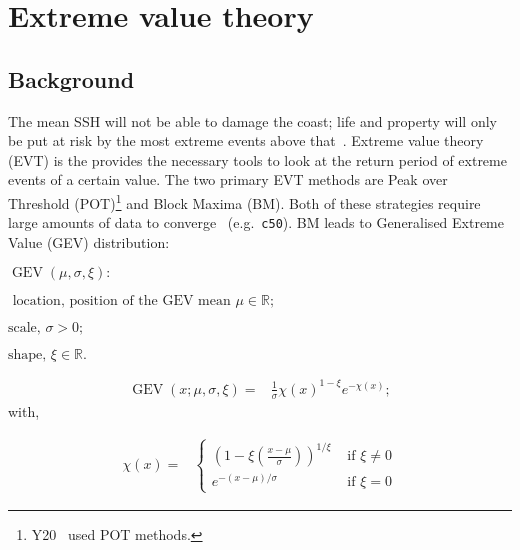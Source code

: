 \newpage
\newpage
[.]
\pagebreak

\section{Extreme value theory}
\label{sec:evt}
\subsection{Background}
The mean SSH will
not be able to damage the coast; life and property will only be put
at risk by the most extreme events above that~\cite{taleb2019statistical, Taleb2012AntifragileH}.
Extreme value theory (EVT) is the provides the necessary tools
to look at the return period of extreme events of a certain value.
The two primary EVT methods are Peak over Threshold (POT)\footnote{Y20~\cite{ZannaPreprint} used POT methods. } and Block Maxima (BM).
Both of these strategies require
large amounts of data to converge~\cite{taleb2019much} (e.g.~\texttt{c50}).
BM leads to Generalised Extreme Value (GEV) distribution:


    \(
    \operatorname{GEV}(\mu, \sigma, \xi):
    \)

    \(
    \text{ location, position of the GEV mean } \mu \in \mathbb{R};
    \)

    \(
    \text{scale, } \sigma>0;
    \)

    \(
    \text{shape, } \xi \in \mathbb{R}.
    \)

    \begin{align}
    \operatorname{GEV}(x; \mu, \sigma, \xi)=&
    \frac{1}{\sigma} \chi(x)^{1-\xi} e^{-\chi(x)}; \tag{GEV-1}
    \label{eq:GEV-1}
    \end{align}
    with,
    \iffalse
    \begin{align}
        \chi(x)=&\{
               \begin{array}{ll}
                    \left(1- \xi\left(\frac{x-
                    \mu}{\sigma} \right)\right)^{\frac{1}{\xi}} &
                     \text { if } \xi \neq 0 \\
                    e^{-\frac{x-\mu}{\sigma}} &
                    \text { if } \xi=0 \\

              \end{array}.
    \tag{GEV-2} \label{eq:GEV-2}

    \end{align}
    \fi
\begin{align}
    \chi(x)=&\left\{\begin{array}{ll}
    \left(1-\xi\left(\frac{x-\mu}{\sigma}\right)\right)^{1 / \xi} & \text { if } \xi \neq 0 \\
    e^{-(x-\mu) / \sigma} & \text { if } \xi=0 \tag{GEV-2}
    \end{array}\right.
   \label{eq:GEV-2}
\end{align}


